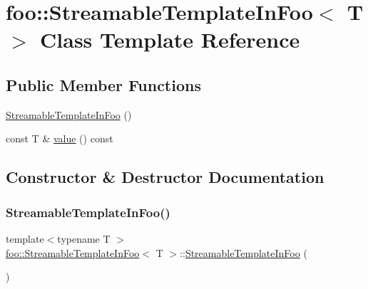 \hypertarget{classfoo_1_1_streamable_template_in_foo}{}\section{foo\+:\+:Streamable\+Template\+In\+Foo$<$ T $>$ Class Template Reference}
\label{classfoo_1_1_streamable_template_in_foo}
\subsection*{Public Member Functions}
\begin{DoxyCompactItemize}
\item 
\hyperlink{classfoo_1_1_streamable_template_in_foo_a0e5d7147d321adf8a2ec348243da70ea}{Streamable\+Template\+In\+Foo} ()
\item 
const T \& \hyperlink{classfoo_1_1_streamable_template_in_foo_aa6e29a9a298014ce74c65423b6985023}{value} () const
\end{DoxyCompactItemize}


\subsection{Constructor \& Destructor Documentation}
\mbox{\label{classfoo_1_1_streamable_template_in_foo_a0e5d7147d321adf8a2ec348243da70ea}} 
\subsubsection{\texorpdfstring{Streamable\+Template\+In\+Foo()}{StreamableTemplateInFoo()}}
{\footnotesize\ttfamily template$<$typename T $>$ \\
\hyperlink{classfoo_1_1_streamable_template_in_foo}{foo\+::\+Streamable\+Template\+In\+Foo}$<$ T $>$\+::\hyperlink{classfoo_1_1_streamable_template_in_foo}{Streamable\+Template\+In\+Foo} (\begin{DoxyParamCaption}{ }\end{DoxyParamCaption})\hspace{0.3cm}{\ttfamily [inline]}}



